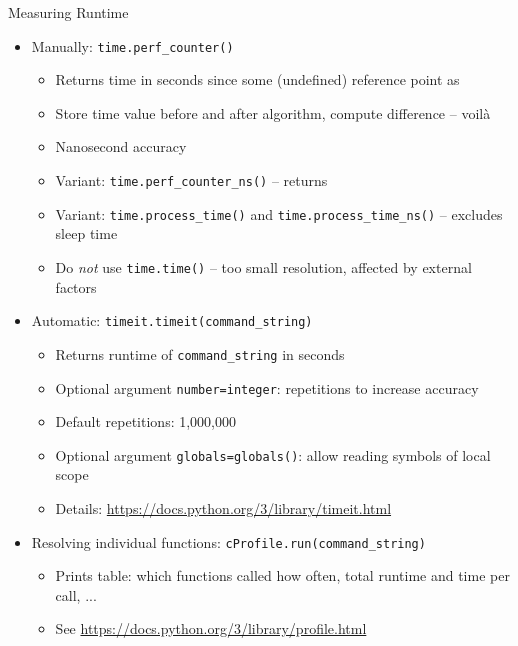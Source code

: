 
\begin{frame}{Measuring Runtime}
%
\begin{itemize}
\item Manually: \texttt{time.perf\_counter()}
	\begin{itemize}
	\item Returns time in seconds since some (undefined) reference point as 
	\item Store time value before and after algorithm, compute difference -- voilà
	\item Nanosecond accuracy
	\item Variant: \texttt{time.perf\_counter\_ns()} -- returns 
	\item Variant: \texttt{time.process\_time()} and \texttt{time.process\_time\_ns()} -- excludes sleep time
	\item Do \emph{not} use \texttt{time.time()} -- too small resolution, affected by external factors
	\end{itemize}
\item Automatic: \texttt{timeit.timeit(command\_string)}
	\begin{itemize}
	\item Returns runtime of \texttt{command\_string} in seconds
	\item Optional argument \texttt{number=integer}: repetitions to increase accuracy
	\item Default repetitions: 1,000,000
	\item Optional argument \texttt{globals=globals()}: allow reading symbols of local scope
	\item Details: \url{https://docs.python.org/3/library/timeit.html}
	\end{itemize}
\item Resolving individual functions: \texttt{cProfile.run(command\_string)}
	\begin{itemize}
	\item Prints table: which functions called how often, total runtime and time per call, ...
	\item See \url{https://docs.python.org/3/library/profile.html}
	\end{itemize}
\end{itemize}
%
\end{frame}


